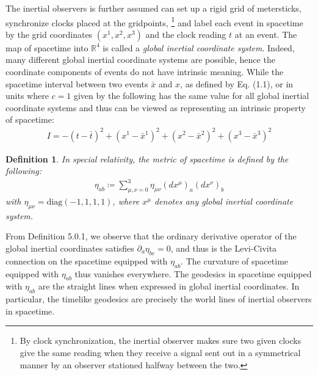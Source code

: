 \documentclass[11pt, onesided]{book}
\theoremstyle{break}
\theoremstyle{break}
\newtheorem{defn}{Definition}[thm]
\newcommand{\R}{\mathbb{R}}
\newcommand{\pd}{\partial}
\begin{document}
The inertial observers is further assumed can set up a rigid grid of metersticks, synchronize clocks placed at the gridpoints, \footnote{By clock synchronization, the inertial observer makes sure two given clocks give the same reading when they receive a signal sent out in a symmetrical manner by an observer stationed halfway between the two.} and label each event in spacetime by the grid coordinates $(x^1, x^2, x^3)$ and the clock reading $t$ at an event. The map of spacetime into $\R^4$ is called a \textit{global inertial coordinate system}. Indeed, many different global inertial coordinate systems are possible, hence the coordinate components of events do not have intrinsic meaning. While the spacetime interval between two events $\bar{x}$ and $x$, as defined by Eq. (1.1), or in units where $c=1$ given by the following has the same value for all global inertial coordinate systems and thus can be viewed as representing an intrinsic property of spacetime:
\begin{align}
I = -(t - \bar{t})^2 + (x^1 - \bar{x}^1 )^2 + (x^2 - \bar{x}^2 )^2 + (x^3 - \bar{x}^3 )^2 
\end{align}
\begin{defn}
In special relativity, the metric of spacetime is defined by the following:
\begin{align*}
\eta_{ab} \coloneqq \sum_{\mu,\nu=0}^3 \eta_{\mu\nu}(dx^\mu)_a(dx^\nu)_b
\end{align*}
with $\eta_{\mu\nu} = \text{diag}(-1,1,1,1)$, where $x^\mu$ denotes any global inertial coordinate system. 
\end{defn}
From Definition 5.0.1, we observe that the ordinary derivative operator of the global inertial coordinates satisfies $\pd_a\eta_{bc}=0$, and thus is the Levi-Civita connection on the spacetime equipped with $\eta_{ab}$. The curvature of spacetime equipped with $\eta_{ab}$ thus vanishes everywhere. The geodesics in spacetime equipped with $\eta_{ab}$ are the straight lines when expressed in global inertial coordinates. In particular, the timelike geodesics are precisely the world lines of inertial observers in spacetime. 
\end{document}
